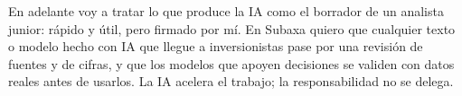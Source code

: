 \documentclass[11pt,letterpaper]{article}
\begin{document}
En adelante voy a tratar lo que produce la IA como el borrador de un analista
junior: rápido y útil, pero firmado por mí. En Subaxa quiero que cualquier
texto o modelo hecho con IA que llegue a inversionistas pase por una revisión
de fuentes y de cifras, y que los modelos que apoyen decisiones se validen
con datos reales antes de usarlos. La IA acelera el trabajo; la
responsabilidad no se delega.

\printbibliography[title={Referencias}]
\end{document}
